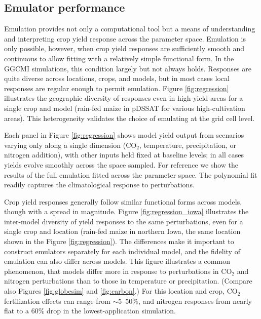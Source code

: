 \documentclass[preprint, 5p, times, twocolumn]{elsarticle}
\begin{document}
\subsection{Emulator performance}
Emulation provides not only a computational tool but a means of understanding and interpreting crop yield response across the parameter space. Emulation is only possible, however, when crop yield responses are sufficiently smooth and continuous to allow fitting with a relatively simple functional form. In the GGCMI simulations, this condition largely but not always holds. 
Responses are quite diverse across locations, crops, and models, but in most cases local responses are regular enough to permit emulation. Figure \ref{fig:regression} illustrates the geographic diversity of responses even in high-yield areas for a single crop and model (rain-fed maize in pDSSAT for various high-cultivation areas).  This heterogeneity validates the choice of emulating at the grid cell level. 

Each panel in Figure \ref{fig:regression} shows model yield output from scenarios varying only along a single dimension (CO$_2$, temperature, precipitation, or nitrogen addition), with other inputs held fixed at baseline levels; in all cases yields evolve smoothly across the space sampled. For reference we show the results of the full emulation fitted across the parameter space. The polynomial fit readily captures the climatological response to perturbations.

Crop yield responses generally follow similar functional forms across models, though with a spread in magnitude. Figure \ref{fig:regression_iowa} illustrates the inter-model diversity of yield responses to the same perturbations, even for a single crop and location (rain-fed maize in northern Iowa, the same location shown in the Figure \ref{fig:regression}). The differences make it important to construct emulators separately for each individual model, and the fidelity of emulation can also differ across models. This figure illustrates a common phenomenon, that models differ more in response to perturbations in CO$_2$ and nitrogen perturbations than to those in temperature or precipitation. (Compare also Figures \ref{fig:globesim} and \ref{fig:carbon}.) For this location and crop, CO$_2$ fertilization effects can range from $\sim$5--50\%, and nitrogen responses from nearly flat to a 60\% drop in the lowest-application simulation. 
\end{document}

